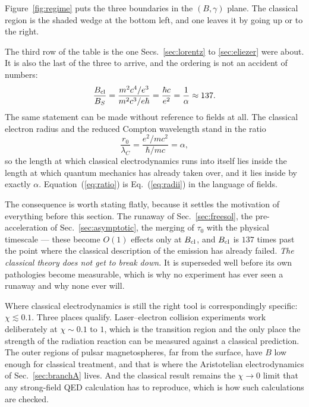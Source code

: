 \documentclass[preprint]{aastex701}
\newcommand{\taunought}{\tau_0}
\begin{document}


Figure~\ref{fig:regime} puts the three boundaries in the $(B,\gamma)$ plane.
The classical region is the shaded wedge at the bottom left, and one leaves it
by going up or to the right.

The third row of the table is the one Secs.~\ref{sec:lorentz} to
\ref{sec:eliezer} were about. It is also the last of the three to arrive, and the ordering is not an
accident of numbers:
\begin{equation}
\frac{B_{\rm cl}}{B_S}
= \frac{m^2c^4/e^3}{m^2c^3/e\hbar}
= \frac{\hbar c}{e^2}
= \frac{1}{\alpha} \approx 137 .
\label{eq:ratio}
\end{equation}
The same statement can be made without reference to fields at all. The
classical electron radius and the reduced Compton wavelength stand in the ratio
\begin{equation}
\frac{r_0}{\lambda_C} = \frac{e^2/mc^2}{\hbar/mc} = \alpha ,
\label{eq:radii}
\end{equation}
so the length at which classical electrodynamics runs into itself lies inside
the length at which quantum mechanics has already taken over, and it lies
inside by exactly $\alpha$. Equation~(\ref{eq:ratio}) is Eq.~(\ref{eq:radii})
in the language of fields.

The consequence is worth stating flatly, because it settles the motivation of
everything before this section. The runaway of Sec.~\ref{sec:freesol}, the
pre-acceleration of Sec.~\ref{sec:asymptotic}, the merging of $\taunought$ with
the physical timescale --- these become $O(1)$ effects only at
$B_{\rm cl}$, and $B_{\rm cl}$ is $137$ times past the point where the
classical description of the emission has already failed. \emph{The classical
theory does not get to break down.} It is superseded well before its own
pathologies become measurable, which is why no experiment has ever seen a
runaway and why none ever will.

Where classical electrodynamics is still the right tool is correspondingly
specific: $\chi\lesssim0.1$. Three places qualify. Laser--electron collision
experiments work deliberately at $\chi\sim0.1$ to $1$, which is the transition
region and the only place the strength of the radiation reaction can be
measured against a classical prediction. The outer regions of pulsar
magnetospheres, far from the surface, have $B$ low enough for classical
treatment, and that is where the Aristotelian electrodynamics of
Sec.~\ref{sec:branchA} lives. And the classical result remains the $\chi\to0$
limit that any strong-field QED calculation has to reproduce, which is how such
calculations are checked.
\end{document}
